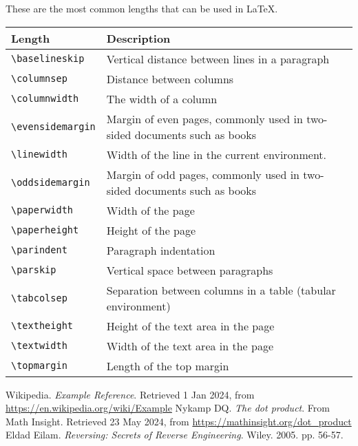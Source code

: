 \documentclass{article}
\begin{document}
\noindent{}
These are the most common lengths that can be used in \LaTeX.

\vspace{1em}
\begin{tabular}{| p{} | p{} |}
  \hline
  Length & Description \\
  \hline
  \verb|\baselineskip|   & Vertical distance between lines in a paragraph \\
  \verb|\columnsep|      & Distance between columns \\
  \verb|\columnwidth|    & The width of a column \\
  \verb|\evensidemargin| & Margin of even pages, commonly used in two-sided
                           documents such as books \\
  \verb|\linewidth|      & Width of the line in the current environment. \\
  \verb|\oddsidemargin|  & Margin of odd pages, commonly used in two-sided
                           documents such as books \\
  \verb|\paperwidth|     & Width of the page \\
  \verb|\paperheight|    & Height of the page \\
  \verb|\parindent|      & Paragraph indentation \\
  \verb|\parskip|        & Vertical space between paragraphs \\
  \verb|\tabcolsep|      & Separation between columns in a table (tabular
                           environment) \\
  \verb|\textheight|     & Height of the text area in the page \\
  \verb|\textwidth|      & Width of the text area in the page \\
  \verb|\topmargin|      & Length of the top margin \\
  \hline
\end{tabular}


\newpage
\begin{thebibliography}{9}
  Wikipedia. \emph{Example Reference}. Retrieved 1 Jan 2024, from
  \url{https://en.wikipedia.org/wiki/Example}
  Nykamp DQ. \emph{The dot product}. From Math Insight. Retrieved 23 May 2024,
  from \url{https://mathinsight.org/dot_product}
  Eldad Eilam. \emph{Reversing: Secrets of Reverse Engineering}.
  Wiley. 2005. pp. 56-57.
\end{thebibliography}
\end{document}
